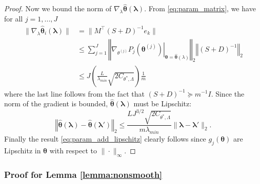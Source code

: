 \documentclass[10pt]{book}
\theoremstyle{definition}
\begin{document}
\begin{proof}
	Now we bound the norm of $\nabla_\lambda \hat{\boldsymbol{\theta}}(\boldsymbol{\lambda})$. From \eqref{eq:param_matrix}, we have for all $j=1,...,J$
	\begin{align}
	\|\nabla_{\lambda}\hat{\boldsymbol{\theta}}_{i}(\boldsymbol{\lambda})\| & =  \|M^{\top}\left(S+D\right)^{-1}e_{k}\|\\
	& \le \sum_{j=1}^{J}\left\Vert \left.\nabla_{\theta^{(j)}}P_{j}(\boldsymbol{\theta}^{(j)})\right|_{\boldsymbol{\theta}=\hat{\boldsymbol{\theta}}(\lambda)}\right\Vert _{2}\left\Vert \left(S+D\right)^{-1}\right\Vert _{2}\\
	& \le  J\left(\frac{L}{\lambda_{min}}\sqrt{2C_{\theta^{*},\Lambda}}\right)\frac{1}{m}
	\end{align}
	where the last line follows from the fact that $(S + D)^{-1} \succeq m^{-1}I$.
	Since the norm of the gradient is bounded, $\hat{\boldsymbol{\theta}}(\boldsymbol{\lambda})$ must be Lipschitz:
	\begin{equation}
	\left\Vert \hat{\boldsymbol{\theta}}(\boldsymbol{\lambda})-\hat{\boldsymbol{\theta}}(\boldsymbol{\lambda}')\right\Vert _{2}\le\frac{LJ^{3/2}\sqrt{2C_{\theta^{*},\Lambda}}}{m\lambda_{min}}\|\boldsymbol{\lambda}-\boldsymbol{\lambda}'\|_{2}.
	\end{equation}
	Finally the result \eqref{eq:param_add_lipschitz} clearly follows since $g_j(\boldsymbol{\theta})$ are Lipschitz in $\boldsymbol{\theta}$ with respect to $\| \cdot \|_\infty$.
\end{proof}

\subsubsection{Proof for Lemma \ref{lemma:nonsmooth}}
\end{document}
